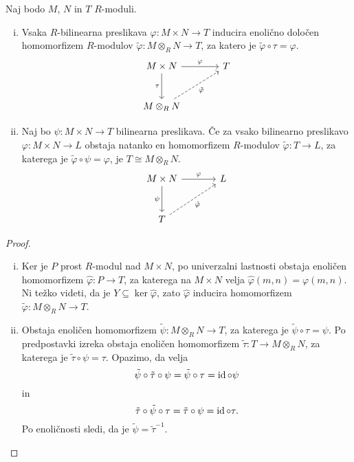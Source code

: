 \begin{izrek}
Naj bodo $M$, $N$ in $T$ $R$-moduli.

\begin{enumerate}[i)]
\item Vsaka $R$-bilinearna preslikava
$\varphi \colon M \times N \to T$ inducira enolično določen
homomorfizem $R$-modulov
$\tilde{\varphi} \colon M \otimes_R N \to T$, za katero je
$\tilde{\varphi} \circ \tau = \varphi$.
\[
\begin{tikzcd}[column sep=large, row sep=large]
M \times N \arrow[r, "\varphi"] \arrow[d, "\tau"'] & T \\
M \otimes_R N \arrow[ur, dashrightarrow, "\tilde{\varphi}"']
\end{tikzcd}
\]
\item Naj bo $\psi \colon M \times N \to T$ bilinearna preslikava.
Če za vsako bilinearno preslikavo $\varphi \colon M \times N \to L$
obstaja natanko en homomorfizem $R$-modulov
$\tilde{\varphi} \colon T \to L$, za katerega je
$\tilde{\varphi} \circ \psi = \varphi$, je $T \cong M \otimes_R N$.
\[
\begin{tikzcd}[column sep=large, row sep=large]
M \times N \arrow[r, "\varphi"] \arrow[d, "\psi"'] & L \\
T \arrow[ur, dashrightarrow, "\tilde{\varphi}"']
\end{tikzcd}
\]
\end{enumerate}
\end{izrek}

\begin{proof}
\phantom{a}
\begin{enumerate}[i)]
\item Ker je $P$ prost $R$-modul nad $M \times N$, po univerzalni
lastnosti obstaja enoličen homomorfizem
$\hat{\varphi} \colon P \to T$, za katerega na $M \times N$ velja
$\hat{\varphi}(m,n) = \varphi(m,n)$. Ni težko videti, da je
$Y \subseteq \ker \hat{\varphi}$, zato $\hat{\varphi}$ inducira
homomorfizem $\tilde{\varphi} \colon M \otimes_R N \to T$.
\item Obstaja enoličen homomorfizem
$\tilde{\psi} \colon M \otimes_R N \to T$, za katerega je
$\tilde{\psi} \circ \tau = \psi$. Po predpostavki izreka obstaja
enoličen homomorfizem $\tilde{\tau} \colon T \to M \otimes_R N$, za
katerega je $\tilde{\tau} \circ \psi = \tau$. Opazimo, da velja
\[
\tilde{\psi} \circ \tilde{\tau} \circ \psi =
\tilde{\psi} \circ \tau = \operatorname{id} \circ \psi
\]
in
\[
\tilde{\tau} \circ \tilde{\psi} \circ \tau =
\tilde{\tau} \circ \psi = \operatorname{id} \circ \tau.
\]
Po enoličnosti sledi, da je $\tilde{\psi} = \tilde{\tau}^{-1}$.
\qedhere
\end{enumerate}
\end{proof}

